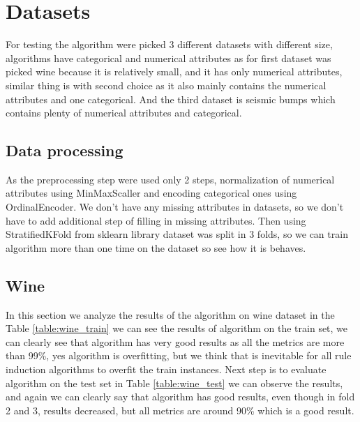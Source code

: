 \documentclass{article}
\begin{document}
\newpage
\section{Datasets}
For testing the algorithm were picked 3 different datasets with different size, algorithms have categorical and numerical attributes as for first dataset was picked wine
because it is relatively small, and it has only numerical attributes, similar thing is with second choice as it also mainly contains the numerical attributes and one categorical.
And the third dataset is seismic bumps which contains plenty of numerical attributes and categorical. 

\subsection{Data processing}
As the preprocessing step were used only 2 steps, normalization of numerical attributes using MinMaxScaller and encoding categorical ones using OrdinalEncoder. We 
don't have any missing attributes in datasets, so we don't have to add additional step of filling in missing attributes. Then using StratifiedKFold from sklearn
library dataset was split in 3 folds, so we can train algorithm more than one time on the dataset so see how it is behaves.
\subsection{Wine}
In this section we analyze the results of the algorithm on wine dataset in the Table \ref{table:wine_train} we can see
the results of algorithm on the train set, we can clearly see that algorithm has very good results as all the metrics
are more than 99\%, yes algorithm is overfitting, but we think that is inevitable for all rule induction algorithms to 
overfit the train instances. Next step is to evaluate algorithm on the test set in Table \ref{table:wine_test} we can
observe the results, and again we can clearly say that algorithm has good results, even though in fold 2 and 3, results 
decreased, but all metrics are around 90\% which is a good result.  \\
\end{document}
